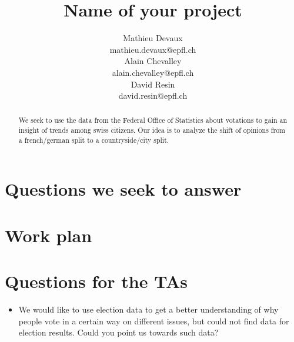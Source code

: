 \documentclass[11pt]{article}
\title{Name of your project}
\author{Mathieu Devaux \\
  {mathieu.devaux@epfl.ch} \\\And
  Alain Chevalley \\
  {alain.chevalley@epfl.ch} \\\And
David Resin \\
{david.resin@epfl.ch} \\}
\date{}
\begin{document}
\maketitle

\begin{abstract}
We seek to use the data from the Federal Office of Statistics about votations to gain an insight of trends among swiss citizens. Our idea is to analyze the shift of opinions from a french/german split to a countryside/city split.
\end{abstract}

\section{Questions we seek to answer}
\section{Work plan}
\section{Questions for the TAs}
\begin{itemize}
\item We would like to use election data to get a better understanding of why people vote in a certain way on different issues, but could not find data for election results. Could you point us towards such data?
\end{itemize}
\end{document}
